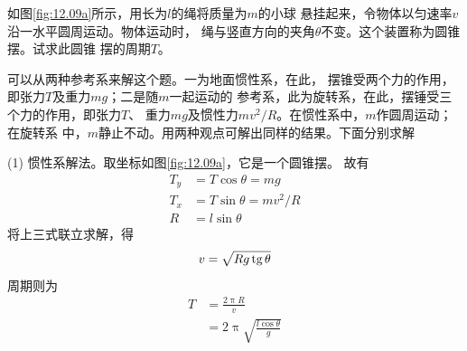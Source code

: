 \example 如图\ref{fig:12.09a}所示，用长为$ l $的绳将质量为$ m $的小球
悬挂起来，令物体以匀速率$ v $沿一水平圆周运动。物体运动时，
绳与竖直方向的夹角$ \theta $不变。这个装置称为圆锥摆。试求此圆锥
摆的周期$ T $。

\begin{figure}[h]
    \centering
    \qquad
    \caption{}
    \label{fig:12.09}
\end{figure}

\solution 可以从两种参考系来解这个题。一为地面惯性系，在此，
摆锥受两个力的作用，即张力$ T $及重力$ mg $；二是随$ m $一起运动的
参考系，此为旋转系，在此，摆锤受三个力的作用，即张力$ T $、
重力$ mg $及惯性力$ mv^2/R $。在惯性系中，$ m $作圆周运动；在旋转系
中，$ m $静止不动。用两种观点可解出同样的结果。下面分别求解

(1) 惯性系解法。取坐标如图\ref{fig:12.09a}，它是一个圆锥摆。
故有
\begin{align*}
    T _ { y } &= T \cos \theta = m g \\
    T _ { x } &= T \sin \theta = m v ^ { 2 } / R \\
    R &= l \sin \theta
\end{align*}
将上三式联立求解，得
\begin{equation*}
    v = \sqrt { R g \operatorname{tg} \theta }
\end{equation*}
周期则为
\begin{align*}
    T &= \frac { 2 \uppi R } { v } \\
      &= 2 \uppi \sqrt{ \frac { l \cos \theta } { g }}
\end{align*}

